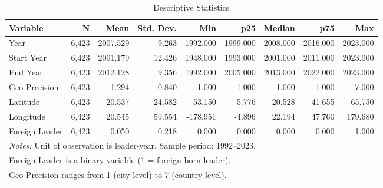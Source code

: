\begin{table}[htbp]
\centering
\caption{Descriptive Statistics}
\label{tab:descriptive}
\begin{tabular}{lrrrrrrrr}
\hline\hline
Variable & N & Mean & Std. Dev. & Min & p25 & Median & p75 & Max \\
\hline
Year & 6,423 & 2007.529 & 9.263 & 1992.000 & 1999.000 & 2008.000 & 2016.000 & 2023.000 \\
Start Year & 6,423 & 2001.179 & 12.426 & 1948.000 & 1993.000 & 2001.000 & 2011.000 & 2023.000 \\
End Year & 6,423 & 2012.128 & 9.356 & 1992.000 & 2005.000 & 2013.000 & 2022.000 & 2023.000 \\
Geo Precision & 6,423 & 1.294 & 0.840 & 1.000 & 1.000 & 1.000 & 1.000 & 7.000 \\
Latitude & 6,423 & 20.537 & 24.582 & -53.150 & 5.776 & 20.528 & 41.655 & 65.750 \\
Longitude & 6,423 & 20.545 & 59.554 & -178.951 & -4.896 & 22.194 & 47.760 & 179.680 \\
Foreign Leader & 6,423 & 0.050 & 0.218 & 0.000 & 0.000 & 0.000 & 0.000 & 1.000 \\
\hline\hline
\multicolumn{9}{l}{\footnotesize \textit{Notes:} Unit of observation is leader-year. Sample period: 1992--2023.} \\
\multicolumn{9}{l}{\footnotesize Foreign Leader is a binary variable (1 = foreign-born leader).} \\
\multicolumn{9}{l}{\footnotesize Geo Precision ranges from 1 (city-level) to 7 (country-level).} \\
\end{tabular}
\end{table}
